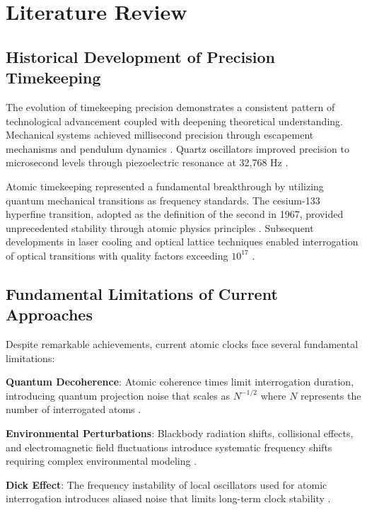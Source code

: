 \documentclass[11pt]{article}
\theoremstyle{remark}
\begin{document}
\section{Literature Review}

\subsection{Historical Development of Precision Timekeeping}

The evolution of timekeeping precision demonstrates a consistent pattern of technological advancement coupled with deepening theoretical understanding. Mechanical systems achieved millisecond precision through escapement mechanisms and pendulum dynamics \cite{turner1993time}. Quartz oscillators improved precision to microsecond levels through piezoelectric resonance at 32,768 Hz \cite{vig1993quartz}. 

Atomic timekeeping represented a fundamental breakthrough by utilizing quantum mechanical transitions as frequency standards. The cesium-133 hyperfine transition, adopted as the definition of the second in 1967, provided unprecedented stability through atomic physics principles \cite{ramsey1950molecular}. Subsequent developments in laser cooling and optical lattice techniques enabled interrogation of optical transitions with quality factors exceeding $10^{17}$ \cite{dehmelt1975proposed,wineland1998experimental}.

\subsection{Fundamental Limitations of Current Approaches}

Despite remarkable achievements, current atomic clocks face several fundamental limitations:

\textbf{Quantum Decoherence}: Atomic coherence times limit interrogation duration, introducing quantum projection noise that scales as $N^{-1/2}$ where $N$ represents the number of interrogated atoms \cite{itano1993quantum}.

\textbf{Environmental Perturbations}: Blackbody radiation shifts, collisional effects, and electromagnetic field fluctuations introduce systematic frequency shifts requiring complex environmental modeling \cite{angstmann2004blackbody,rosenband2008frequency}.

\textbf{Dick Effect}: The frequency instability of local oscillators used for atomic interrogation introduces aliased noise that limits long-term clock stability \cite{dick1987local}.
\end{document}
